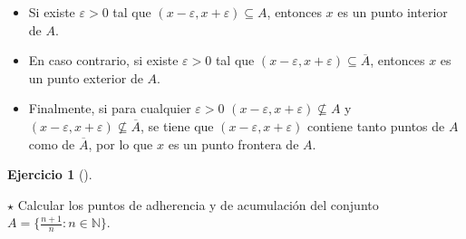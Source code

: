 \documentclass[
  a4paper,
]{scrreport}
\providecommand{\tightlist}{%
  \setlength{\itemsep}{0pt}\setlength{\parskip}{0pt}}\usepackage{longtable,booktabs,array}
\theoremstyle{definition}
\newtheorem{exercise}{Ejercicio}[chapter]
\theoremstyle{remark}
\begin{document}
\begin{tcolorbox}
\begin{itemize}
\tightlist
\item
  Si existe \(\varepsilon>0\) tal que
  \((x-\varepsilon, x+\varepsilon)\subseteq A\), entonces \(x\) es un
  punto interior de \(A\).
\item
  En caso contrario, si existe \(\varepsilon>0\) tal que
  \((x-\varepsilon, x+\varepsilon)\subseteq \overline{A}\), entonces
  \(x\) es un punto exterior de \(A\).
\item
  Finalmente, si para cualquier \(\varepsilon>0\)
  \((x-\varepsilon, x+\varepsilon)\not\subseteq A\) y
  \((x-\varepsilon, x+\varepsilon)\not\subseteq \overline{A}\), se tiene
  que \((x-\varepsilon, x+\varepsilon)\) contiene tanto puntos de \(A\)
  como de \(\overline{A}\), por lo que \(x\) es un punto frontera de
  \(A\).
\end{itemize}

\end{tcolorbox}

\leavevmode{}%
\begin{exercise}[]\label{exr-particion-interior-exterior-frontera}

\(\star\) Calcular los puntos de adherencia y de acumulación del
conjunto \(A=\{\frac{n+1}{n}:n\in\mathbb{N}\}\).

\end{exercise}
\end{document}
